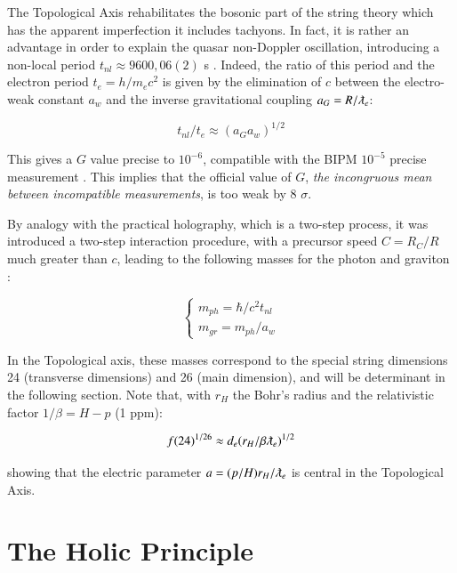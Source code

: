 \documentclass[a4paper,9pt]{article}
\begin{document}
    
     

The Topological Axis rehabilitates the bosonic part of the string theory which has the apparent imperfection it includes tachyons. In fact, it is rather an advantage in order to explain the quasar non-Doppler oscillation, introducing a non-local period $t_{nl} \approx 9600,06 (2) $ s \cite{Kotov}. Indeed, the ratio of this period and the electron period $t_e = h/m_ec^2$ is given by the elimination of $c$ between the electro-weak constant $a_w$ and the inverse gravitational coupling $a_G = R/\lambdabar_e $:

\begin{equation}\label{Eq8}
t_{nl} /t_e   \approx  (a_G a_w)^{1/2}
\end{equation}


This gives a $G$ value precise to $10^{-6}$, compatible with the BIPM $10^{-5}$ precise measurement \cite {Quinn}. This implies that the official value of $G$, \textit{the incongruous mean between incompatible measurements}, is too weak by 8 $\sigma$.

\pagebreak

By analogy with the practical holography, which is a two-step process, it was introduced a two-step interaction procedure, with a precursor speed $C = R_C/R$ much greater than $c$, leading to the following masses for the photon and graviton \cite{Sanchez3}:

\begin{equation}\label{Eq9}
 \left\{
    \begin{array}{ll}
        m_{ph} = \hbar/c^2t_{nl}\\
        m_{gr} =m_{ph}/a_w
    \end{array}
\right.
\end{equation}

In the Topological axis, these masses correspond to the special string dimensions 24 (transverse dimensions) and 26 (main dimension), and will be determinant in the following section. Note that, with $r_H$ the Bohr's radius and the relativistic factor $1/\beta = H-p$ (1 ppm):

\begin{equation}\label{Eq10}
f(24)^{1/26} \approx d_e (r_H/\beta\lambdabar_e)^{1/2}
\end{equation}

showing that the electric parameter $ a = (p/H)r_H/\lambdabar_e$ is central in the Topological Axis.

%
\section{The Holic Principle}
\end{document}
